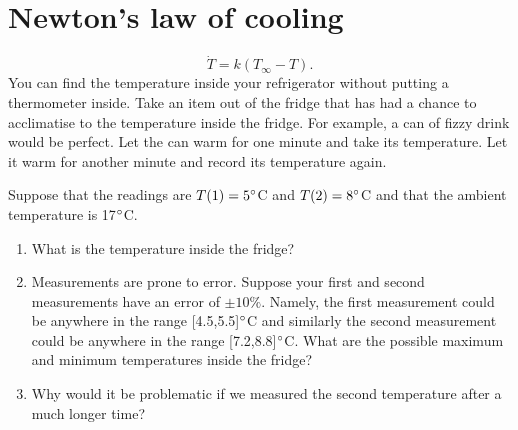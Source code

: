 \documentclass[10pt]{article}
\newcommand{\bb}{\begin{equation}}
\newcommand{\ee}{\end{equation}}
\begin{document}
\section{Newton's law of cooling}
\bb
\dot{T}=k(T_\infty-T)\label{Newtons_law_cooling}.
\ee
You can find the temperature inside your refrigerator without putting a thermometer inside. Take an item out of the fridge that has had a chance to acclimatise to the temperature inside the fridge. For example, a can of fizzy drink would be perfect. Let the can warm for one minute and take its temperature. Let it warm for another minute and record its temperature again.

Suppose that the readings are $T(1) = 5\degree$C and $T(2)=8\degree$C and that the ambient temperature is 17$\degree$C.

\begin{enumerate}
\item What is the temperature inside the fridge?
\item Measurements are prone to error. Suppose your first and second measurements have an error of $\pm10\%$. Namely, the first measurement could be anywhere in the range [4.5,5.5]$\degree$C and similarly the second measurement could be anywhere in the range [7.2,8.8]$\degree$C. What are the possible maximum and minimum temperatures inside the fridge?
\item Why would it be problematic if we measured the second temperature after a much longer time?
\end{enumerate}
\end{document}
